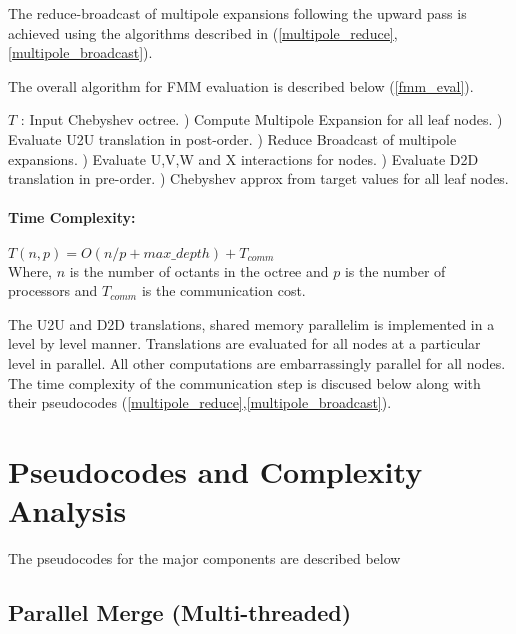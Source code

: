 \documentclass[11pt]{article}
\begin{document}
The reduce-broadcast of multipole expansions following the upward pass is 
achieved using the algorithms described in (\ref{multipole_reduce},
\ref{multipole_broadcast}).

The overall algorithm for FMM evaluation is described below (\ref{fmm_eval}).


\begin{algorithm}[H]
\caption{$FMM\_Eval$}
\label{fmm_eval}
\begin{algorithmic}
  \STATE $T$ : Input Chebyshev octree.
  \STATE
  ) Compute Multipole Expansion for all leaf nodes.
  ) Evaluate U2U translation in post-order.
  \STATE
  ) Reduce Broadcast of multipole expansions.
  \STATE
  ) Evaluate U,V,W and X interactions for nodes.
  ) Evaluate D2D translation in pre-order.
  \STATE
  ) Chebyshev approx from target values for all leaf nodes.
\end{algorithmic}
\end{algorithm}

\paragraph{Time Complexity:}
$T(n,p) = O(n/p + max\_depth) + T_{comm}$\\
Where, $n$ is the number of octants in the octree and $p$ is the number of 
processors and $T_{comm}$ is the communication cost.

The U2U and D2D translations, shared memory parallelim is implemented in a 
level by level manner. Translations are evaluated for all nodes at a particular 
level in parallel. All other computations are embarrassingly parallel for all 
nodes. The time complexity of the communication step is discused below along 
with their pseudocodes (\ref{multipole_reduce},\ref{multipole_broadcast}).




\section{Pseudocodes and Complexity Analysis}

The pseudocodes for the major components are described below

\subsection{Parallel Merge (Multi-threaded)}
\end{document}
